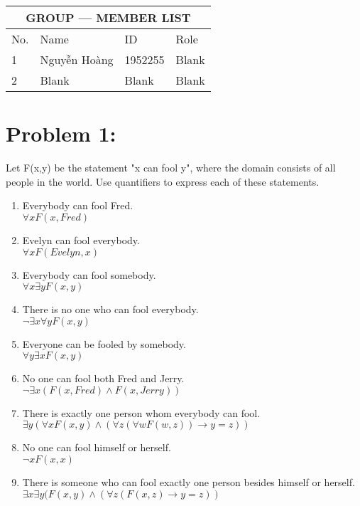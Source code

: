 \documentclass[12pt,en,a4paper]{report}
\begin{document}
	\begin{table}[]
		\centering
		\begin{tabular}{|p{}|p{}|p{}|p{}|}
			\hline
			\multicolumn{4}{|c|}{GROUP --- MEMBER LIST} \\
			\hline
			No. & Name & ID & Role \\
			\hline
			1 & Nguyễn Hoàng & 1952255 & Blank \\
			\hline
			2 & Blank & Blank & Blank \\
			\hline
		\end{tabular}
	\end{table}
	\section*{Problem 1:}
	Let F(x,y) be the statement "x can fool y", where the domain consists of all people in the world. Use quantifiers to express each of these statements.
	\begin{enumerate}
		\item Everybody can fool Fred.\\
		$\forall x F(x, Fred)$
		\item Evelyn can fool everybody.\\
		$\forall x F(Evelyn, x)$
		\item Everybody can fool somebody.\\
		$\forall x \exists y F(x, y)$
		\item There is no one who can fool everybody.\\
		$\neg \exists x \forall y F(x, y)$
		\item Everyone can be fooled by somebody.\\
		$\forall y \exists x F(x, y)$
		\item No one can fool both Fred and Jerry.\\
		$\neg \exists x (F(x, Fred) \wedge F(x, Jerry))$
		\item There is exactly one person whom everybody can fool.\\
		$\exists y (\forall x F(x, y) \wedge (\forall z (\forall w F(w, z))\rightarrow y=z))$
		\item No one can fool himself or herself.\\
		$\neg x F(x, x)$
		\item There is someone who can fool exactly one person besides himself or herself.\\
		$\exists x \exists y (F(x, y) \wedge (\forall z (F(x, z) \rightarrow y = z))$
	\end{enumerate}
\newpage
{}
\end{document}
